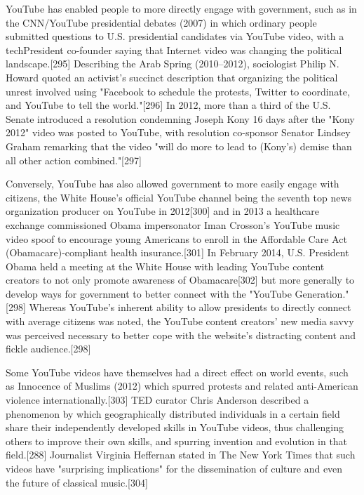 \documentclass[12pt]{article}
\begin{document}
YouTube has enabled people to more directly engage with government, such as in the CNN/YouTube presidential debates (2007) in which ordinary people submitted questions to U.S. presidential candidates via YouTube video, with a techPresident co-founder saying that Internet video was changing the political landscape.[295] Describing the Arab Spring (2010–2012), sociologist Philip N. Howard quoted an activist's succinct description that organizing the political unrest involved using "Facebook to schedule the protests, Twitter to coordinate, and YouTube to tell the world."[296] In 2012, more than a third of the U.S. Senate introduced a resolution condemning Joseph Kony 16 days after the "Kony 2012" video was posted to YouTube, with resolution co-sponsor Senator Lindsey Graham remarking that the video "will do more to lead to (Kony's) demise than all other action combined."[297] 




Conversely, YouTube has also allowed government to more easily engage with citizens, the White House's official YouTube channel being the seventh top news organization producer on YouTube in 2012[300] and in 2013 a healthcare exchange commissioned Obama impersonator Iman Crosson's YouTube music video spoof to encourage young Americans to enroll in the Affordable Care Act (Obamacare)-compliant health insurance.[301] In February 2014, U.S. President Obama held a meeting at the White House with leading YouTube content creators to not only promote awareness of Obamacare[302] but more generally to develop ways for government to better connect with the "YouTube Generation."[298] Whereas YouTube's inherent ability to allow presidents to directly connect with average citizens was noted, the YouTube content creators' new media savvy was perceived necessary to better cope with the website's distracting content and fickle audience.[298]

Some YouTube videos have themselves had a direct effect on world events, such as Innocence of Muslims (2012) which spurred protests and related anti-American violence internationally.[303] TED curator Chris Anderson described a phenomenon by which geographically distributed individuals in a certain field share their independently developed skills in YouTube videos, thus challenging others to improve their own skills, and spurring invention and evolution in that field.[288] Journalist Virginia Heffernan stated in The New York Times that such videos have "surprising implications" for the dissemination of culture and even the future of classical music.[304]
\end{document}
